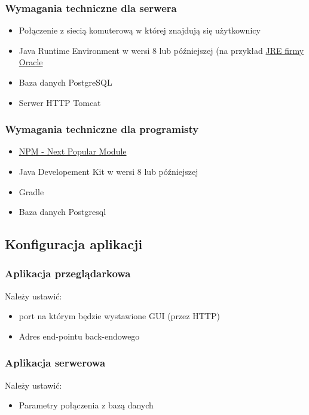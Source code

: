 \documentclass[polish,12pt]{aghthesis}
\begin{document}
\subsubsection{Wymagania techniczne dla serwera}
\begin{itemize}
    \item Połączenie z siecią komuterową w której znajdują się użytkownicy
    \item Java Runtime Environment w wersi 8 lub późniejszej (na przykład \href{https://www.java.com/pl/download/manual.jsp}{JRE firmy Oracle}
    \item Baza danych PostgreSQL
    \item Serwer HTTP Tomcat
\end{itemize}

\subsubsection{Wymagania techniczne dla programisty}
\begin{itemize}
    \item \href{https://www.npmjs.com/}{NPM - Next Popular Module}
    \item Java Developement Kit w wersi 8 lub późniejszej
    \item Gradle
    \item Baza danych Postgresql
\end{itemize}


\subsection{Konfiguracja aplikacji}
\subsubsection{Aplikacja przeglądarkowa}{Należy ustawić:
\begin{itemize}
    \item port na którym będzie wystawione GUI (przez HTTP)
    \item Adres end-pointu back-endowego
\end{itemize}}
\subsubsection{Aplikacja serwerowa}{Należy ustawić:
\begin{itemize}
    \item Parametry połączenia z bazą danych
\end{itemize}}
\end{document}

